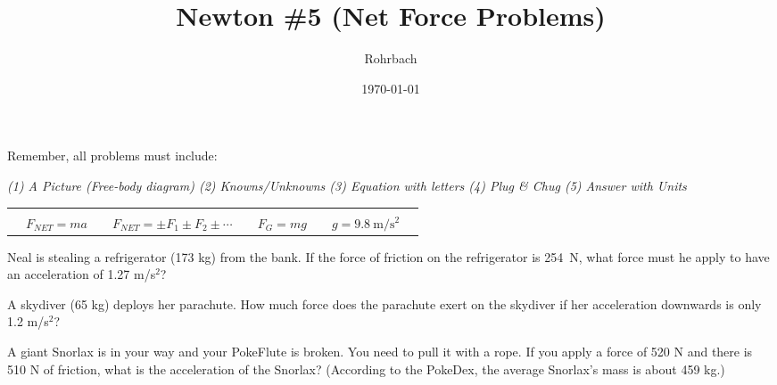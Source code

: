 \documentclass[10pt]{exam}
\title{Newton \#5 (Net Force Problems)}
\author{Rohrbach}
\date{\today}
\newcommand{\printeqs}{
  \begin{center}
    \begin{tabular}{|*9c|}
      \hline 
      &&&&&&&&\\
      &
      $F_{NET}=ma$ &&
      $F_{NET}=\pm F_1 \pm F_2 \pm \cdots$ &&
      $F_G=mg$ &&
      $g=\SI{9.8}{\meter\per\second^2}$ &
      \\
      \hline
    \end{tabular}
  \end{center}
}
\begin{document}
\maketitle

\noindent
Remember, all problems must include:

\begin{center}
  \it
   (1) A Picture (Free-body diagram) \hspace{3em}    
   (2) Knowns/Unknowns \hspace{3em}    
   (3) Equation with letters \hspace{3em}
   (4) Plug \& Chug  \hspace{5em}
   (5) Answer with Units
\end{center}

\printeqs

\begin{questions}
  
    \question
      Neal is stealing a refrigerator (173 kg) from the bank.  If the force of friction on the refrigerator is 254~N, what force must he apply to have an acceleration of 1.27 m/s$^2$?
      \vs


    \question
      A skydiver (65 kg) deploys her parachute.  How much force does the parachute exert on the skydiver if her acceleration downwards is only 1.2 m/s$^2$?
      \vs

    \question
      A giant Snorlax is in your way and your PokeFlute is broken.  You need to pull it with a rope.  If you apply a force of 520 N and there is 510 N of friction, what is the acceleration of the Snorlax?   (According to the PokeDex, the average Snorlax's mass is about 459 kg.)
      \vs

  

\end{questions}
\end{document}
